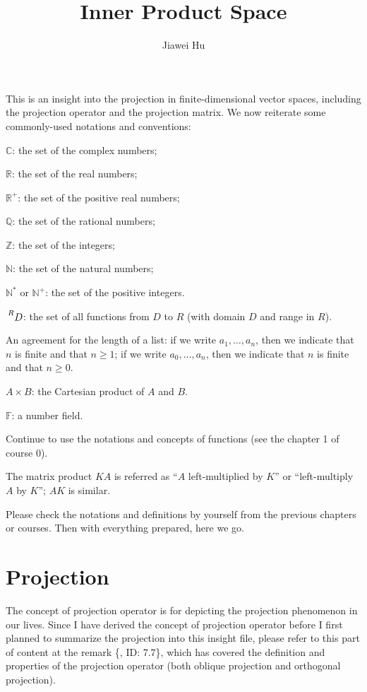 \documentclass{article}
\title{\LARGE \textbf{Inner Product Space}}
\author{\large Jiawei Hu}
\begin{document}
\maketitle

This is an insight into the projection in finite-dimensional vector spaces, including the projection operator and the projection matrix. We now reiterate some commonly-used notations and conventions:
\begin{compactenum}
    \item $\mathbb{C}$: the set of the complex numbers;
    \item $\mathbb{R}$: the set of the real numbers;
    \item $\mathbb{R}^+$: the set of the positive real numbers;
    \item $\mathbb{Q}$: the set of the rational numbers;
    \item $\mathbb{Z}$: the set of the integers;
    \item $\mathbb{N}$: the set of the natural numbers;
    \item $\mathbb{N^\ast}$ or $\mathbb{N}^+$: the set of the positive integers.
    \item $\sideset{^R}{}{\mathop{D}}$: the set of all functions from $D$ to $R$ (with domain $D$ and range in $R$).
    \item An agreement for the length of a list: if we write $a_1, \dots, a_n$, then we indicate that $n$ is finite and that $n\geq 1$; if we write $a_0, \dots, a_n$, then we indicate that $n$ is finite and that $n\geq 0$.
    \item $A\times B$: the Cartesian product of $A$ and $B$.
    \item $\mathbb{F}$: a number field.
    \item Continue to use the notations and concepts of functions (see the chapter 1 of course 0).
    \item The matrix product $KA$ is referred as ``$A$ left-multiplied by $K$'' or ``left-multiply $A$ by $K$''; $AK$ is similar.
\end{compactenum} 
Please check the notations and definitions by yourself from the previous chapters or courses. Then with everything prepared, here we go.

\section{Projection}

The concept of projection operator is for depicting the projection phenomenon in our lives. Since I have derived the concept of projection operator before I first planned to summarize the projection into this insight file, please refer to this part of content at the remark \{, ID: 7.7\}, which has covered the definition and properties of the projection operator (both oblique projection and orthogonal projection).
\end{document}
